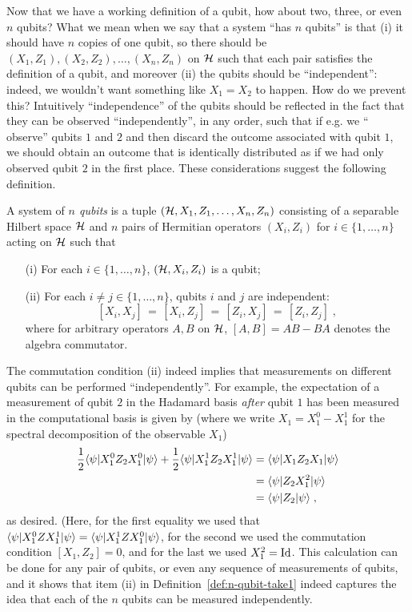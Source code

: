 Now that we have a working definition of a qubit, how about two, three, or even $n$ qubits? What we mean when we say that a system ``has $n$ qubits'' is that (i) it should have $n$ copies of one qubit, so there should be $(X_1,Z_1), (X_2,Z_2),\ldots,(X_n,Z_n)$ on $\mathcal{H}$ such that each pair satisfies the definition of a qubit, and moreover (ii) the qubits should be ``independent'': indeed, we wouldn't want something like $X_1=X_2$ to happen. How do we prevent this? Intuitively ``independence'' of the qubits should be reflected in the fact that they can be observed ``independently'', in any order, such that if e.g. we `` observe'' qubits $1$ and $2$ and then discard the outcome associated with qubit $1$, we should obtain an outcome that is identically distributed as if we had only observed qubit $2$ in the first place. These considerations suggest the following definition. 

\begin{definition}\label{def:n-qubit-take1}
A system of \emph{$n$ qubits} is a tuple $(\mathcal{H},X_1,Z_1,\ldots,X_n,Z_n)$ consisting of a separable Hilbert space $\mathcal{H}$ and $n$ pairs of Hermitian operators $(X_i,Z_i)$ for $i\in\{1,\ldots,n\}$ acting on $\mathcal{H}$ such that
\begin{enumerate}
\item[(i)] For each $i\in \{1,\ldots,n\}$, $(\mathcal{H},X_i,Z_i)$ is a qubit;
\item[(ii)] For each $i\neq j\in \{1,\ldots,n\}$, qubits $i$ and $j$ are independent:
\[ [X_i,X_j]\,=\,[X_i,Z_j]\,=\,[Z_i,X_j]\,=\,[Z_i,Z_j]\;,\]
where for arbitrary operators $A,B$ on $\mathcal{H}$, $[A,B]=AB-BA$ denotes the algebra commutator. 
\end{enumerate}
\end{definition}

The commutation condition (ii) indeed implies that measurements on different qubits can be performed ``independently''. For example, the expectation of a measurement of qubit $2$ in the Hadamard basis \emph{after} qubit $1$ has been measured in the computational basis is given by (where we write $X_1 = X_1^0 - X_1^1$ for the spectral decomposition of the observable $X_1$)
\begin{align*}
\frac{1}{2} \langle\psi| X_1^0 Z_2 X_1^0 |\psi\rangle + \frac{1}{2} \langle\psi| X_1^1 Z_2 X_1^1 |\psi\rangle &= \langle\psi| X_1 Z_2 X_1 |\psi\rangle \\
&= \langle\psi|  Z_2 X_1^2 |\psi\rangle\\
&= \langle\psi|  Z_2  |\psi\rangle\;,
\end{align*}
as desired. (Here, for the first equality we used that  $\langle\psi| X_1^0 Z X_1^1 |\psi\rangle  =  \langle\psi| X_1^1 Z X_1^0 |\psi\rangle $, for the second we used the commutation condition $[X_1,Z_2]=0$, and for the last we used $X_1^2=\mathop{\rm Id}\nolimits$. This calculation can be done for any pair of qubits, or even any sequence of measurements of qubits, and it shows that item (ii) in Definition~\ref{def:n-qubit-take1} indeed captures the idea that each of the $n$ qubits can be measured independently. 

